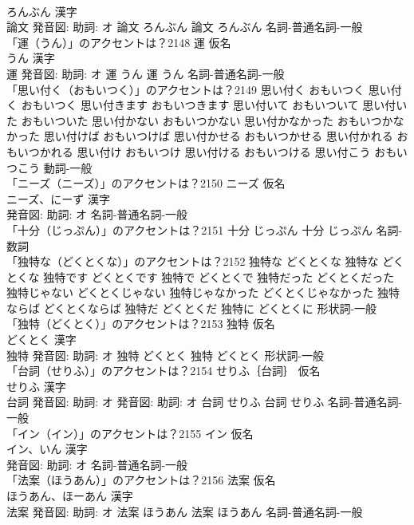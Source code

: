\documentclass[8pt]{extreport}
\begin{document}
\begin{CJK}{UTF8}{min}
\\	ろんぶん 漢字　
\\	論文 発音図: 助詞: オ	論文 ろんぶん		論文 ろんぶん				名詞-普通名詞-一般 
\\	「運（うん）」のアクセントは？2148	運 仮名　
\\	うん 漢字　
\\	運 発音図: 助詞: オ	運 うん		運 うん				名詞-普通名詞-一般 
\\	「思い付く（おもいつく）」のアクセントは？2149		思い付く おもいつく		思い付く おもいつく 思い付きます おもいつきます 思い付いて おもいついて 思い付いた おもいついた 思い付かない おもいつかない 思い付かなかった おもいつかなかった 思い付けば おもいつけば 思い付かせる おもいつかせる 思い付かれる おもいつかれる 思い付け おもいつけ 思い付ける おもいつける 思い付こう おもいつこう				動詞-一般 
\\	「ニーズ（ニーズ）」のアクセントは？2150	ニーズ 仮名　
\\	ニーズ、にーず 漢字　
\\	発音図: 助詞: オ							名詞-普通名詞-一般 
\\	「十分（じっぷん）」のアクセントは？2151		十分 じっぷん		十分 じっぷん				名詞-数詞 
\\	「独特な（どくとくな）」のアクセントは？2152		独特な どくとくな		独特な どくとくな 独特です どくとくです 独特で どくとくで 独特だった どくとくだった 独特じゃない どくとくじゃない 独特じゃなかった どくとくじゃなかった 独特ならば どくとくならば 独特だ どくとくだ 独特に どくとくに				形状詞-一般 
\\	「独特（どくとく）」のアクセントは？2153	独特 仮名　
\\	どくとく 漢字　
\\	独特 発音図: 助詞: オ	独特 どくとく		独特 どくとく				形状詞-一般 
\\	「台詞（せりふ）」のアクセントは？2154	せりふ｛台詞｝ 仮名　
\\	せりふ 漢字　
\\	台詞 発音図: 助詞: オ 発音図: 助詞: オ	台詞 せりふ		台詞 せりふ				名詞-普通名詞-一般 
\\	「イン（イン）」のアクセントは？2155	イン 仮名　
\\	イン、いん 漢字　
\\	発音図: 助詞: オ							名詞-普通名詞-一般 
\\	「法案（ほうあん）」のアクセントは？2156	法案 仮名　
\\	ほうあん、ほーあん 漢字　
\\	法案 発音図: 助詞: オ	法案 ほうあん		法案 ほうあん				名詞-普通名詞-一般 

\end{CJK}
\end{document}
